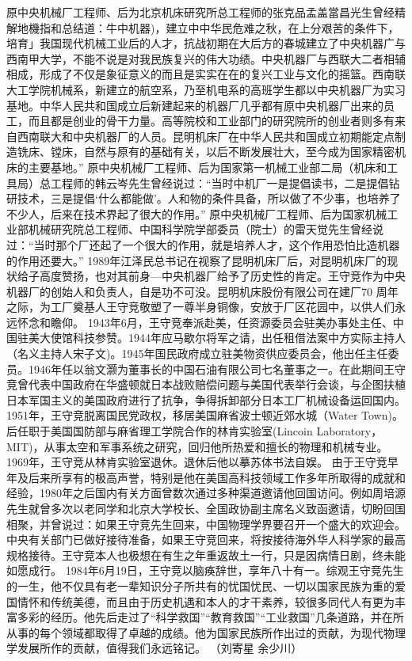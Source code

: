 原中央机械厂工程师、后为北京机床研究所总工程师的张克品孟盖當昌光生曾经精解地機指和总结道：牛中机器)，建立中中华民危难之秋，在上分艰苦的条件下，培育」我国现代机械工业后的人才，抗战初期在大后方的春城建立了中央机器广与西南甲大学，不能不说是对我民族复兴的伟大功绩。中央机器厂与西联大二者相辅相成，形成了不仅是象征意义的而且是实实在在的复兴工业与文化的摇篮。西南联大工学院机械系，新建立的航空系，乃至机电系的高班学生都以中央机器厂为实习基地。中华人民共和国成立后新建起来的机器厂几乎都有原中央机器厂出来的员工，而且都是创业的骨干力量。高等院校和工业部门的研究院所的创业者则多有来自西南联大和中央机器厂的人员。昆明机床厂在中华人民共和国成立初期能定点制造铣床、镗床，自然与原有的基础有关，以后不断发展壮大，至今成为国家精密机床的主要基地。”
原中央机械厂工程师、后为国家第一机械工业部二局（机床和工具局）总工程师的韩云岑先生曾经说过：“当时中机厂一是提倡读书，二是提倡钻研技术，三是提倡‘什么都能做’。人和物的条件具备，所以做了不少事，也培养了不少人，后来在技术界起了很大的作用。”
原中央机械厂工程师、后为国家机械工业部机械研究院总工程师、中国科学院学部委员（院士）的雷天觉先生曾经说过：“当时那个厂还起了一个很大的作用，就是培养人才，这个作用恐怕比造机器的作用还要大。”
1989年江泽民总书记在视察了昆明机床厂后，对昆明机床厂的现状给子高度赞扬，也对其前身—中央机器厂给予了历史性的肯定。王守竞作为中央机器厂的创始人和负责人，自是功不可没。昆明机床股份有限公司在建厂70 周年之际，为工厂奠基人王守竞敬塑了一尊半身铜像，安放于厂区花园中，以供人们永远怀念和瞻仰。
1943年6月，王守竞奉派赴美，任资源委员会驻美办事处主任、中国驻美大使馆科技参赞。1944年应马歇尔将军之请，出任租借法案中方实际主持人（名义主持人宋子文)。1945年国民政府成立驻美物资供应委员会，他出任主任委员。1946年任以翁文灏为董事长的中国石油有限公司七名董事之一。在此期间王守竞曾代表中国政府在华盛顿就日本战败赔偿问题与美国代表举行会谈，与企图扶植日本军国主义的美国政府进行了抗争，争得拆卸部分日本工厂机械设备运回国内。
1951年，王守竞脱离国民党政权，移居美国麻省波士顿近郊水城（Water Town)。后任职于美国国防部与麻省理工学院合作的林肯实验室(Lincoin Laboratory，MIT)，从事太空和军事系统之研究，回归他所热爱和擅长的物理和机械专业。
1969年，王守竞从林肯实验室退休。退休后他以摹苏体书法自娱。
由于王守竞早年及后来所享有的极高声誉，特别是他在美国高科技领域工作多年所取得的成就和经验，1980年之后国内有关方面曾数次通过多种渠道邀请他回国访问。例如周培源先生就曾多次以老同学和北京大学校长、全国政协副主席名义致函邀请，切盼回国相聚，并曾说过：如果王守竞先生回来，中国物理学界要召开一个盛大的欢迎会。中央有关部门已做好接待准备，如果王守竞回来，将按接待海外华人科学家的最高规格接待。王守竞本人也极想在有生之年重返故土一行，只是因病情日剧，终未能如愿成行。
1984年6月19日，王守竞以脑痪辞世，享年八十有一。综观王守竞先生的一生，他不仅具有老一辈知识分子所共有的忧国忧民、一切以国家民族为重的爱国情怀和传统美德，而且由于历史机遇和本人的才干素养，较很多同代人有更为丰富多彩的经历。他先后走过了“科学救国”“教育救国”“工业救国”几条道路，并在所从事的每个领域都取得了卓越的成绩。他为国家民族所作出过的贡献，为现代物理学发展所作的贡献，值得我们永远铭记。
（刘寄星 余少川）

